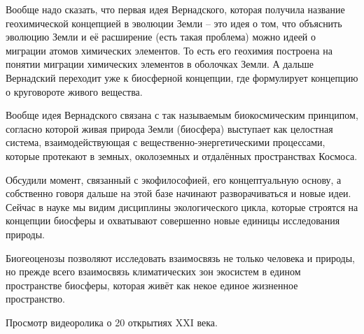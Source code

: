 \documentclass[main.tex]{subfiles}
\begin{document}
Вообще надо сказать, что первая идея Вернадского, которая получила название геохимической концепцией в эволюции Земли -- это идея о том, что объяснить эволюцию Земли и её расширение (есть такая проблема) можно идеей о миграции атомов химических элементов.
То есть его геохимия построена на понятии миграции химических элементов в оболочках Земли.
А дальше Вернадский переходит уже к биосферной концепции, где формулирует концепцию о круговороте живого вещества.

Вообще идея Вернадского связана с так называемым биокосмическим принципом, согласно которой живая природа Земли (биосфера) выступает как целостная система, взаимодействующая с вещественно-энергетическими процессами, которые протекают в земных, околоземных и отдалённых пространствах Космоса.

Обсудили момент, связанный с экофилософией, его концептуальную основу, а собственно говоря дальше на этой базе начинают разворачиваться и новые идеи.
Сейчас в науке мы видим дисциплины экологического цикла, которые строятся на концепции биосферы и охватывают совершенно новые единицы исследования природы.

Биогеоценозы позволяют исследовать взаимосвязь не только человека и природы, но прежде всего взаимосвязь климатических зон экосистем в едином пространстве биосферы, которая живёт как некое единое жизненное пространство.


Просмотр видеоролика о 20 открытиях XXI века.
\end{document}
